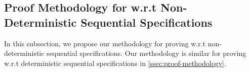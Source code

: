 {\subsection{Proof Methodology for \crdtlin{} w.r.t Non-Deterministic Sequential Specifications}
\label{subsec:appendix proof methodology for RA-linearizability w.r.t non-deterministic sequential specifications}

In this subsection, we propose our methodology for proving \crdtlin{} w.r.t non-deterministic sequential specifications. Our methodology is similar for proving \crdtlin{} w.r.t deterministic sequential specifications in \sectionautorefname \ref{ssec:proof-methodology}.








}
